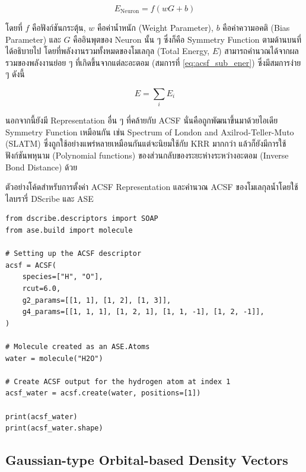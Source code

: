 \begin{equation}
    \label{eq:acsf_sub_ener}
    E_{\text{Neuron}} = f(w G + b) 
\end{equation}

\noindent โดยที่ $f$ คือฟังก์ชันกระตุ้น, $w$ คือค่าน้ำหนัก (Weight Parameter), $b$ คือค่าความอคติ (Bias Parameter) และ $G$ 
คืออินพุตของ Neuron นั้น ๆ ซึ่งก็คือ Symmetry Function ตามด้านบนที่ได้อธิบายไป โดยที่พลังงานรวมทั้งหมดของโมเลกุล (Total Energy, 
$E$) สามารถคำนวณได้จากผลรวมของพลังงานย่อย ๆ ที่เกิดขึ้นจากแต่ละอะตอม (สมการที่ \ref{eq:acsf_sub_ener}) ซึ่งมีสมการง่าย ๆ ดังนี้

\begin{equation}
    E = \sum_{i} E_{i}
\end{equation}

นอกจากนี้ยังมี Representation อื่น ๆ ที่คล้ายกับ ACSF นั่นคือถูกพัฒนาขึ้นมาด้วยไอเดีย Symmetry Function เหมือนกัน เช่น 
Spectrum of London and Axilrod-Teller-Muto (SLATM) ซึ่งถูกใช้อย่างแพร่หลายเหมือนกันแต่จะนิยมใช้กับ KRR มากกว่า%
\autocite{faber2018,huang2020} แล้วก็ยังมีการใช้ฟังก์ชันพหุนาม (Polynomial functions) ของส่วนกลับของระยะห่างระหว่างอะตอม
(Inverse Bond Distance) ด้วย\autocite{kwac2019,musil2021}

ตัวอย่างโค้ดสำหรับการตั้งค่า ACSF Representation และคำนวณ ACSF ของโมเลกุลน้ำโดยใช้ไลบรารี่ DScribe และ ASE

\begin{lstlisting}[style=MyPython]
from dscribe.descriptors import SOAP
from ase.build import molecule

# Setting up the ACSF descriptor
acsf = ACSF(
    species=["H", "O"],
    rcut=6.0,
    g2_params=[[1, 1], [1, 2], [1, 3]],
    g4_params=[[1, 1, 1], [1, 2, 1], [1, 1, -1], [1, 2, -1]],
)

# Molecule created as an ASE.Atoms
water = molecule("H2O")

# Create ACSF output for the hydrogen atom at index 1
acsf_water = acsf.create(water, positions=[1])

print(acsf_water)
print(acsf_water.shape)
\end{lstlisting}

\subsection{Gaussian-type Orbital-based Density Vectors}
\label{ssec:gauss_orb_den}

